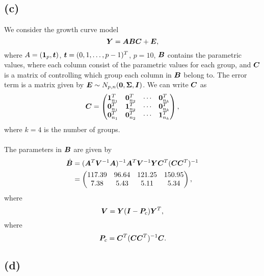 \subsection*{(c)}
\label{sec:c-6}

We consider the growth curve model 
\begin{equation*}
  \bm{Y} = \bm{ABC} +  \bm{E},
\end{equation*}
where $A = (\bm{1}_{p},\bm{t})$, $\bm{t} = (0, 1, \dots, p - 1)^{T}$, $p =
10$,  $\bm{B}$ contains
the parametric values, where each column 
consist of the parametric values for each group,  and $\bm{C}$ is a
matrix of controlling which group each column in $\bm{B}$ belong to. The
error term is a matrix given by $\bm{E} \sim N_{p, n}(\bm{0}, \bm{\Sigma}, \bm{I})$. We can write $\bm{C}$ as
\begin{equation*}
  \bm{C} =
  \begin{pmatrix}
    \bm{1}_{n_{1}}^{T} & \bm{0}_{n_{2}}^{T} & \cdots & \bm{0}_{n_{k}}^{T} \\
    \bm{0}_{n_{1}}^{T} & \bm{1}_{n_{2}}^{T} & \cdots & \bm{0}_{n_{k}}^{T} \\
    \bm{0}_{n_{1}}^{T} & \bm{0}_{n_{2}}^{T} & \cdots & \bm{1}_{n_{k}}^{T}
  \end{pmatrix},
\end{equation*}
where $k = 4$ is the number of groups. \\
\\
The parameters in $\bm{B}$ are given by 
\begin{align*}
  \hatb B &= (\b A^{T}\b V^{-1}\b A)^{-1}  \b A^{T}\b V^{-1}\b Y
              \b C^{T}(\b C\b C^{T})^{-1} %
  \\
  &=
  \begin{pmatrix}
    117.39 &96.64 &121.25 &150.95 \\ 
    7.38 &5.43 &5.11 &5.34
  \end{pmatrix},
\end{align*}
where
\begin{equation*}
  \bm{V} =  \bm{Y}  (\bm{I} - \bm{P}_{c})  \bm{Y}^{T},
\end{equation*}
where
\begin{equation*}
  \bm{P}_{c} = \bm{C}^{T}(\bm{C}\bm{C}^{T})^{-1}\bm{C}.
\end{equation*}

\subsection*{(d)}
\label{sec:d-2}

